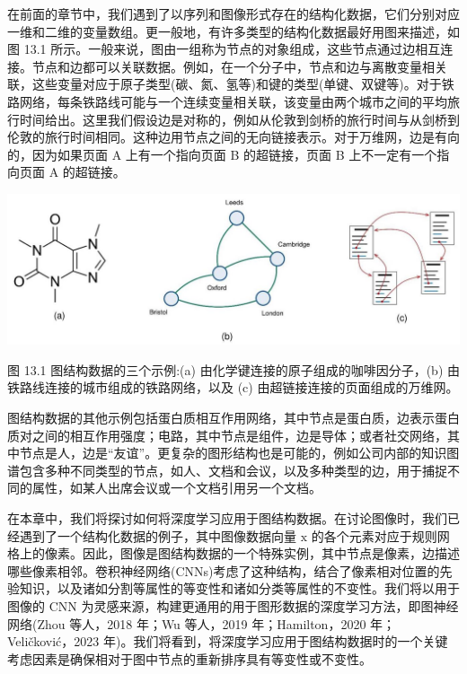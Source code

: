 \documentclass[10pt]{report}
\begin{document}
在前面的章节中，我们遇到了以序列和图像形式存在的结构化数据，它们分别对应一维和二维的变量数组。更一般地，有许多类型的结构化数据最好用图来描述，如图 13.1 所示。一般来说，图由一组称为节点的对象组成，这些节点通过边相互连接。节点和边都可以关联数据。例如，在一个分子中，节点和边与离散变量相关联，这些变量对应于原子类型(碳、氮、氢等)和键的类型(单键、双键等)。对于铁路网络，每条铁路线可能与一个连续变量相关联，该变量由两个城市之间的平均旅行时间给出。这里我们假设边是对称的，例如从伦敦到剑桥的旅行时间与从剑桥到伦敦的旅行时间相同。这种边用节点之间的无向链接表示。对于万维网，边是有向的，因为如果页面 A 上有一个指向页面 B 的超链接，页面 B 上不一定有一个指向页面 A 的超链接。

\begin{center}
\includegraphics[max width=1.0\textwidth]{images/0194e279-9b28-703a-88f4-c3ac21e2010d_427_231_375_1334_446_0.jpg}
\end{center}
\hspace*{3em} 

图 13.1 图结构数据的三个示例:(a) 由化学键连接的原子组成的咖啡因分子，(b) 由铁路线连接的城市组成的铁路网络，以及 (c) 由超链接连接的页面组成的万维网。

图结构数据的其他示例包括蛋白质相互作用网络，其中节点是蛋白质，边表示蛋白质对之间的相互作用强度；电路，其中节点是组件，边是导体；或者社交网络，其中节点是人，边是“友谊”。更复杂的图形结构也是可能的，例如公司内部的知识图谱包含多种不同类型的节点，如人、文档和会议，以及多种类型的边，用于捕捉不同的属性，如某人出席会议或一个文档引用另一个文档。

在本章中，我们将探讨如何将深度学习应用于图结构数据。在讨论图像时，我们已经遇到了一个结构化数据的例子，其中图像数据向量 \(\mathrm{x}\) 的各个元素对应于规则网格上的像素。因此，图像是图结构数据的一个特殊实例，其中节点是像素，边描述哪些像素相邻。卷积神经网络(CNNs)考虑了这种结构，结合了像素相对位置的先验知识，以及诸如分割等属性的等变性和诸如分类等属性的不变性。我们将以用于图像的 CNN 为灵感来源，构建更通用的用于图形数据的深度学习方法，即图神经网络(Zhou 等人，2018 年；Wu 等人，2019 年；Hamilton，2020 年；Veličković，2023 年)。我们将看到，将深度学习应用于图结构数据时的一个关键考虑因素是确保相对于图中节点的重新排序具有等变性或不变性。
\end{document}
